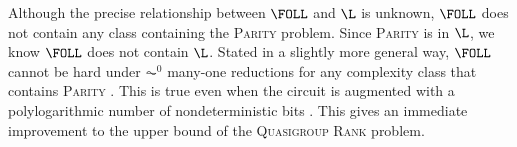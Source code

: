 



Although the precise relationship between $\FOLL$ and $\L$ is unknown, $\FOLL$ does not contain any class containing the \textsc{Parity} problem.
Since \textsc{Parity} is in $\L$, we know $\FOLL$ does not contain $\L$.
Stated in a slightly more general way, $\FOLL$ cannot be hard under $\AC^0$ many-one reductions for any complexity class that contains \textsc{Parity} \cite[Proposition~2.1]{bklm01}.
This is true even when the circuit is augmented with a polylogarithmic number of nondeterministic bits \cite[Section~4]{ctw13}.
This gives an immediate improvement to the upper bound of the \textsc{Quasigroup Rank} problem.

